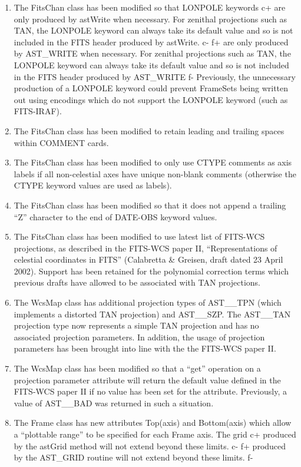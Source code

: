 \documentclass[twoside,11pt]{starlink}
\begin{document}
\begin{enumerate}

\item The FitsChan class has been modified so that LONPOLE keywords
c+
are only produced by astWrite when necessary. For zenithal projections such as
TAN, the LONPOLE keyword can always take its default value and so is
not included in the FITS header produced by astWrite.
c-
f+
are only produced by AST\_WRITE when necessary. For zenithal projections such as
TAN, the LONPOLE keyword can always take its default value and so is
not included in the FITS header produced by AST\_WRITE
f-
Previously, the unnecessary production of a LONPOLE keyword could prevent
FrameSets being written out using encodings which do not support the
LONPOLE keyword (such as FITS-IRAF).

\item The FitsChan class has been modified to retain leading and trailing
spaces within COMMENT cards.

\item The FitsChan class has been modified to only use CTYPE comments as
axis labels if all non-celestial axes have unique non-blank comments
(otherwise the CTYPE keyword values are used as labels).

\item The FitsChan class has been modified so that it does not append a
trailing ``Z'' character to the end of DATE-OBS keyword values.

\item The FitsChan class has been modified to use latest list of FITS-WCS
projections, as described in the FITS-WCS paper II, ``Representations of
celestial coordinates in FITS'' (Calabretta \& Greisen, draft dated 23
April 2002). Support has been retained for the polynomial correction
terms which previous drafts have allowed to be associated with TAN
projections.

\item The WcsMap class has additional projection types of AST\_\_TPN
(which implements a distorted TAN projection) and AST\_\_SZP. The AST\_\_TAN
projection type now represents a simple TAN projection and has no
associated projection parameters. In addition, the usage of projection
parameters has been brought into line with the the FITS-WCS paper II.

\item The WcsMap class has been modified so that a ``get'' operation on a
projection parameter attribute will return the default value defined in the
FITS-WCS paper II if no value has been set for the attribute. Previously, a
value of AST\_\_BAD was returned in such a situation.

\item The Frame class has new attributes Top(axis) and Bottom(axis) which
allow a ``plottable range'' to be specified for each Frame axis. The grid
c+
produced by the astGrid method will not extend beyond these limits.
c-
f+
produced by the AST\_GRID routine will not extend beyond these limits.
f-

\end{enumerate}
\end{document}

